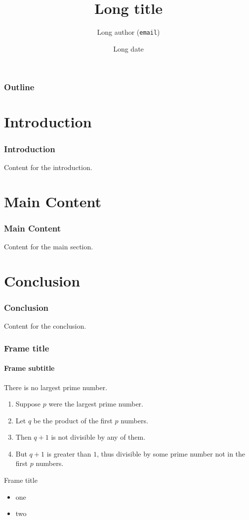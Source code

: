\documentclass{beamer}
\title[Short title]{Long title}
\date[Short date]{Long date}
\author[Short author]{Long author (\texttt{email})}
\begin{document}
\begin{frame}
\titlepage
\end{frame}

\begin{frame}
\frametitle{Outline}
\tableofcontents
\end{frame}

\section{Introduction}
\begin{frame}
\frametitle{Introduction}
Content for the introduction.
\end{frame}

\section{Main Content}
\begin{frame}
\frametitle{Main Content}
Content for the main section.
\end{frame}

\section{Conclusion}
\begin{frame}
\frametitle{Conclusion}
Content for the conclusion.
\end{frame}


\begin{frame} 
\frametitle{Frame title} 
\framesubtitle{Frame subtitle}
\begin{theorem}
There is no largest prime number. \end{theorem} 
\begin{enumerate} 
\item<1-| alert@1> Suppose $p$ were the largest prime number. 
\item<2-> Let $q$ be the product of the first $p$ numbers. 
\item<3-> Then $q+1$ is not divisible by any of them. 
\item<1-> But $q + 1$ is greater than $1$, thus divisible by some prime
number not in the first $p$ numbers.
\end{enumerate}
\end{frame}

\begin{frame}{Frame title}
\begin{itemize}
\item one
\item two
\end{itemize}
\end{frame}
\end{document}

